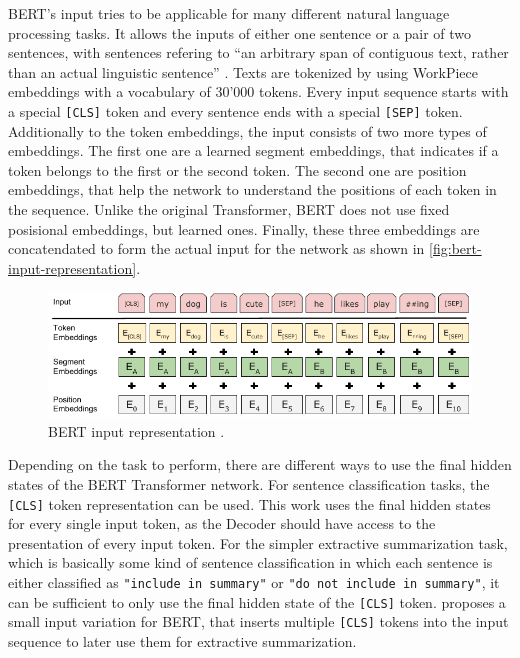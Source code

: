 BERT's input tries to be applicable for many different natural language processing tasks.
It allows the inputs of either one sentence or a pair of two sentences, with sentences refering to ``an arbitrary span of contiguous text, rather than an actual linguistic sentence'' \cite[p.~4]{devlin2018bert}.
Texts are tokenized by using WorkPiece embeddings with a vocabulary of 30'000 tokens. %
Every input sequence starts with a special \texttt{[CLS]} token and every sentence ends with a special \texttt{[SEP]} token.
Additionally to the token embeddings, the input consists of two more types of embeddings.
The first one are a learned segment embeddings, that indicates if a token belongs to the first or the second token.
The second one are position embeddings, that help the network to understand the positions of each token in the sequence.
Unlike the original Transformer, BERT does not use fixed posisional embeddings, but learned ones.
Finally, these three embeddings are concatendated to form the actual input for the network as shown in \autoref{fig:bert-input-representation}.

\begin{figure}[h]
\centering
\includegraphics{figures/bert-input-representation}
\caption[BERT input representation]{BERT input representation \cite[p.~5]{devlin2018bert}.}
\label{fig:bert-input-representation}
\end{figure}

Depending on the task to perform, there are different ways to use the final hidden states of the BERT Transformer network.
For sentence classification tasks, the \texttt{[CLS]} token representation can be used.
This work uses the final hidden states for every single input token, as the Decoder should have access to the presentation of every input token.
For the simpler extractive summarization task, which is basically some kind of sentence classification in which each sentence is either classified as \texttt{"include in summary"} or \texttt{"do not include in summary"}, it can be sufficient to only use the final hidden state of the \texttt{[CLS]} token. 
\cite{1903.10318} proposes a small input variation for BERT, that inserts multiple \texttt{[CLS]} tokens into the input sequence to later use them for extractive summarization.

